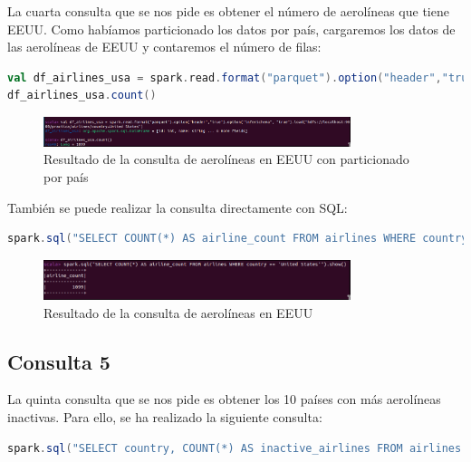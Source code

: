La cuarta consulta que se nos pide es obtener el número de aerolíneas que tiene EEUU. Como habíamos particionado los datos por país, cargaremos los datos de las aerolíneas de EEUU y contaremos el número de filas:

\begin{lstlisting}[language=scala]
val df_airlines_usa = spark.read.format("parquet").option("header","true").option("inferSchema", "true").load("hdfs://localhost:9000/practica/airlines/country=United States")
df_airlines_usa.count()
\end{lstlisting}

\begin{figure}[H]
    \centering
    \includegraphics[width=0.8\textwidth]{figures/69.png}
    \caption{Resultado de la consulta de aerolíneas en EEUU con particionado por país}
    \label{fig:consulta4-1}
\end{figure}

También se puede realizar la consulta directamente con SQL:

\begin{lstlisting}[language=scala]
spark.sql("SELECT COUNT(*) AS airline_count FROM airlines WHERE country == 'United States'").show()
\end{lstlisting}

\begin{figure}[H]
    \centering
    \includegraphics[width=0.8\textwidth]{figures/63.png}
    \caption{Resultado de la consulta de aerolíneas en EEUU}
    \label{fig:consulta4-2}
\end{figure}

\subsection{Consulta 5}

La quinta consulta que se nos pide es obtener los 10 países con más aerolíneas inactivas. Para ello, se ha realizado la siguiente consulta:

\begin{lstlisting}[language=scala]
spark.sql("SELECT country, COUNT(*) AS inactive_airlines FROM airlines WHERE active == 'f' GROUP BY country ORDER BY inactive_airlines DESC LIMIT 10").show()
\end{lstlisting}

